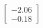 \documentclass[preview]{standalone}
\begin{document}
\begin{align*}
\begin{bmatrix} -2.06 \\ -0.18 \end{bmatrix}
\end{align*}
\end{document}
